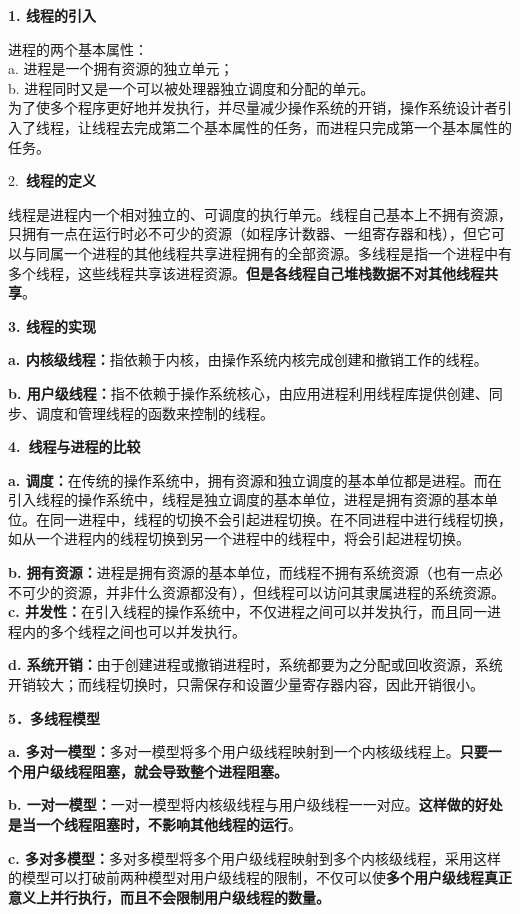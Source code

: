 {\textbf{{1. 线程的引入}}\\
}

进程的两个基本属性：\\
a. 进程是一个拥有资源的独立单元；\\
b. 进程同时又是一个可以被处理器独立调度和分配的单元。\\
为了使多个程序更好地并发执行，并尽量减少操作系统的开销，{操作系统设计者引入了线程，让线程去完成第二个基本属性的任务}，而进程只完成第一个基本属性的任务。

{2.~}\textbf{{线程的定义}}

{线程是进程内一个相对独立的、可调度的执行单元。线程自己基本上不拥有资源，只拥有一点在运行时必不可少的资源（如程序计数器、一组寄存器和栈），但它可以与同属一个进程的其他线程共享进程拥有的全部资源。}{多线程是指一个进程中有多个线程，这些线程共享该进程资源。}\textbf{但是各线程自己堆栈数据不对其他线程共享}{。}

\textbf{{3. 线程的实现}}

{\textbf{a.
内核级线程：}}{指依赖于内核，由操作系统内核完成创建和撤销工作的线程}{。}

{{\textbf{b.
用户级线程}}\textbf{：}}{指不依赖于操作系统核心，由应用进程利用线程库提供创建、同步、调度和管理线程的函数来控制的线程}{。}

\textbf{{\textbf{{4.~}}{线程与进程的比较}}}

\textbf{{a.
调度：}}在传统的操作系统中，拥有资源和独立调度的基本单位都是进程。而在引入线程的操作系统中，线程是独立调度的基本单位，进程是拥有资源的基本单位。{在同一进程中，线程的切换不会引起进程切换。在不同进程中进行线程切换，如从一个进程内的线程切换到另一个进程中的线程中，将会引起进程切换。}

\textbf{{b.
拥有资源：}}进程是拥有资源的基本单位，而线程不拥有系统资源（也有一点必不可少的资源，并非什么资源都没有），但线程可以访问其隶属进程的系统资源。\\

\textbf{{c.
并发性：}}在引入线程的操作系统中，不仅进程之间可以并发执行，而且同一进程内的多个线程之间也可以并发执行。

\textbf{{d.
系统开销：}}由于创建进程或撤销进程时，系统都要为之分配或回收资源，系统开销较大；而线程切换时，只需保存和设置少量寄存器内容，因此开销很小。

\textbf{{5．多线程模型}}

\textbf{{a.
多对一模型：}}多对一模型将多个用户级线程映射到一个内核级线程上。\textbf{只要一个用户级线程阻塞，就会导致整个进程阻塞。}

\textbf{{b.
一对一模型：}}一对一模型将内核级线程与用户级线程一一对应。\textbf{这样做的好处是当一个线程阻塞时，不影响其他线程的运行}。

\textbf{{c.
多对多模型：}}多对多模型将多个用户级线程映射到多个内核级线程，采用这样的模型可以打破前两种模型对用户级线程的限制，不仅可以使\textbf{多个用户级线程真正意义上并行执行，而且不会限制用户级线程的数量。}
